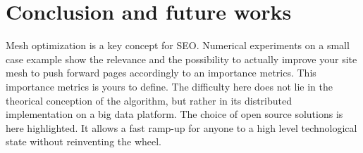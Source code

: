 \documentclass{iSWAGArticle}
\begin{document}
\section{Conclusion and future works}
Mesh optimization is a key concept for SEO. Numerical experiments on a small case example show the relevance and the possibility to actually improve your site mesh
to push forward pages accordingly to an importance metrics. This importance metrics is yours to define. The difficulty here does not lie in the
theorical conception of the algorithm, but rather in its distributed implementation on a big data platform. The choice of open source solutions
is here highlighted. It allows a fast ramp-up for anyone to a high level technological state without reinventing the wheel.
\nocite{*}


\end{document}
